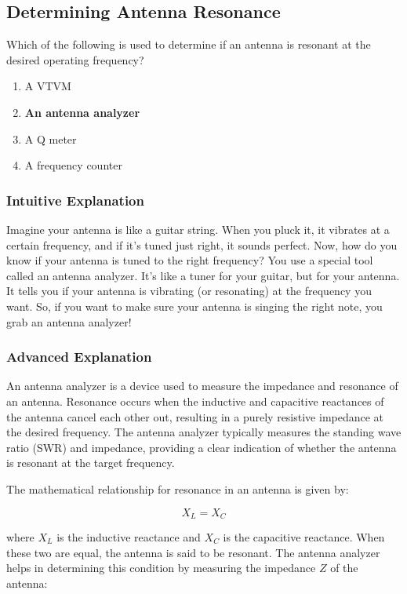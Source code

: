 \subsection{Determining Antenna Resonance}
\label{T7C02}

\begin{tcolorbox}[colback=gray!10!white,colframe=black!75!black,title=T7C02]
Which of the following is used to determine if an antenna is resonant at the desired operating frequency?
\begin{enumerate}[label=\Alph*)]
    \item A VTVM
    \item \textbf{An antenna analyzer}
    \item A Q meter
    \item A frequency counter
\end{enumerate}
\end{tcolorbox}

\subsubsection{Intuitive Explanation}
Imagine your antenna is like a guitar string. When you pluck it, it vibrates at a certain frequency, and if it’s tuned just right, it sounds perfect. Now, how do you know if your antenna is tuned to the right frequency? You use a special tool called an antenna analyzer. It’s like a tuner for your guitar, but for your antenna. It tells you if your antenna is vibrating (or resonating) at the frequency you want. So, if you want to make sure your antenna is singing the right note, you grab an antenna analyzer!

\subsubsection{Advanced Explanation}
An antenna analyzer is a device used to measure the impedance and resonance of an antenna. Resonance occurs when the inductive and capacitive reactances of the antenna cancel each other out, resulting in a purely resistive impedance at the desired frequency. The antenna analyzer typically measures the standing wave ratio (SWR) and impedance, providing a clear indication of whether the antenna is resonant at the target frequency.

The mathematical relationship for resonance in an antenna is given by:

\[
X_L = X_C
\]

where \(X_L\) is the inductive reactance and \(X_C\) is the capacitive reactance. When these two are equal, the antenna is said to be resonant. The antenna analyzer helps in determining this condition by measuring the impedance \(Z\) of the antenna:

